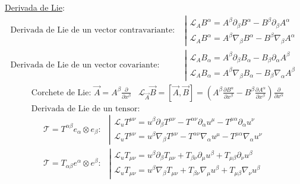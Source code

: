 \underline{Derivada de Lie}:
\vspace{-3pt}
\begin{align*}
    \text{Derivada de Lie de un vector contravariante: }&
    \left|
\begin{array}{l}
\mathcal{L}_AB^\alpha=A^\beta\partial_\beta B^\alpha - B^\beta\partial_\beta A^\alpha \\
\mathcal{L}_AB^\alpha=A^\beta\nabla_\beta B^\alpha - B^\beta\nabla_\beta A^\alpha
\end{array}
\right. \\
    \text{Derivada de Lie de un vector covariante: }&
    \left|
\begin{array}{l}
 \mathcal{L}_AB_\alpha=A^\beta\partial_\beta B_\alpha - B_\beta\partial_\alpha A^\beta\\
 \mathcal{L}_AB_\alpha=A^\beta\nabla_\beta B_\alpha - B_\beta\nabla_\alpha A^\beta
\end{array}
\right.
\end{align*}
\begin{align*}
    &\text{Corchete de Lie: } \vec{A}=A^\beta \tfrac{\partial}{\partial x^\beta}\;\; \; \mathcal{L}_{\vec{A}}\vec{B}=[\vec{A},\vec{B}]=\left(A^\beta\tfrac{\partial B^\alpha}{\partial x^\beta}-B^\beta\tfrac{\partial A^\alpha}{\partial x^\beta}\right)\tfrac{\partial}{\partial x^\alpha}\\
    &\text{Derivada de Lie de un tensor:}
\end{align*}
\begin{align*}
    \mathcal{T}=T^{\alpha \beta }e_\alpha \otimes e_\beta:&
    \left|
\begin{array}{l}
\mathcal{L}_uT^{\mu\nu}=u^\beta\partial_\beta T^{\mu\nu}-
T^{\alpha\nu}\partial_\alpha u^\mu-
T^{\mu \alpha}\partial_\alpha u^\nu\\
\mathcal{L}_uT^{\mu\nu}=u^\beta\nabla_\beta T^{\mu\nu}-
T^{\alpha\nu}\nabla_\alpha u^\mu-
T^{\mu \alpha}\nabla_\alpha u^\nu
\end{array}
\right. \\
       \mathcal{T}=T_{\alpha \beta }e^\alpha \otimes e^\beta:&
    \left|
\begin{array}{l}
 \mathcal{L}_uT_{\mu\nu}=u^\beta\partial_\beta T_{\mu\nu}+
T_{\beta\nu}\partial_\mu u^\beta+
T_{\mu \beta}\partial_\nu u^\beta\\
\mathcal{L}_uT_{\mu\nu}=u^\beta\nabla_\beta T_{\mu\nu}+
T_{\beta\nu}\nabla_\mu u^\beta+
T_{\mu \beta}\nabla_\nu u^\beta
\end{array}
\right.
\end{align*}
